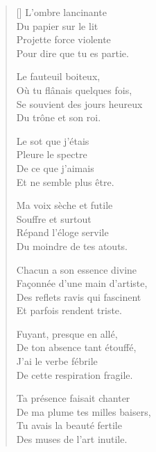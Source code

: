 \settowidth{\versewidth}{De ma plume tes milles baisers,}
\begin{verse}[\versewidth]
L'ombre lancinante \\
Du papier sur le lit \\
Projette force violente \\
Pour dire que tu es partie.

Le fauteuil boiteux, \\
Où tu flânais quelques fois, \\
Se souvient des jours heureux \\
Du trône et son roi.

Le sot que j'étais \\
Pleure le spectre \\
De ce que j'aimais \\
Et ne semble plus être.

Ma voix sèche et futile \\
Souffre et surtout \\
Répand l'éloge servile \\
Du moindre de tes atouts.

Chacun a son essence divine \\
Façonnée d'une main d'artiste, \\
Des reflets ravis qui fascinent \\
Et parfois rendent triste.

Fuyant, presque en allé, \\
De ton absence tant étouffé, \\
J'ai le verbe fébrile \\
De cette respiration fragile.

\newpage

Ta présence faisait chanter \\
De ma plume tes milles baisers, \\
Tu avais la beauté fertile \\
Des muses de l'art inutile.
\end{verse}


